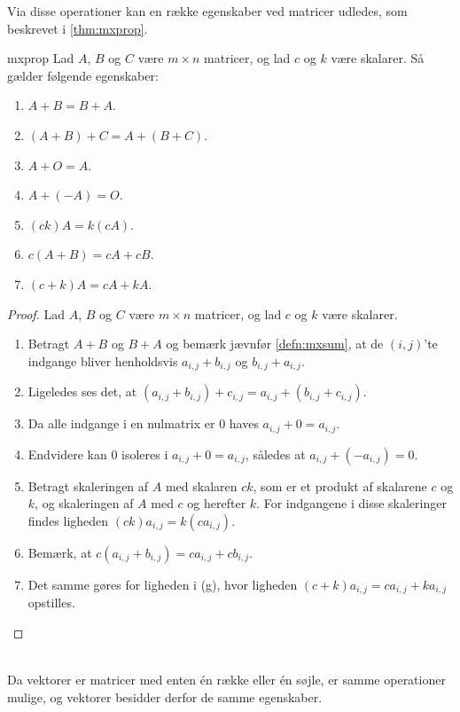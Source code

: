 %
Via disse operationer kan en række egenskaber ved matricer udledes, som beskrevet i \ref{thm:mxprop}.
%
\begin{thm}{}{mxprop}
Lad $A$, $B$ og $C$ være $m \times n$ matricer, og lad $c$ og $k$ være skalarer.
Så gælder følgende egenskaber:
\begin{enumerate}[label=(\alph*)]
\item $A + B = B + A$.
\item $(A + B) + C = A + (B + C)$.
\item $A + O = A$.
\item $A + (-A) = O$.
\item $(ck)A = k(cA)$.
\item $c(A + B) = cA + cB$.
\item $(c + k)A = cA + kA$.
\end{enumerate}
\end{thm}
%
\begin{proof}
Lad $A$, $B$ og $C$ være $m \times n$ matricer, og lad $c$ og $k$ være skalarer.
\begin{enumerate}[label=(\alph*)]
\item Betragt $A + B$ og $B + A$ og bemærk jævnfør \ref{defn:mxsum}, at de $(i,j)$'te indgange bliver henholdsvis $a_{i,j} + b_{i,j}$ og $b_{i,j} + a_{i,j}$.
%
\item Ligeledes ses det, at $(a_{i,j} + b_{i,j}) + c_{i,j} = a_{i,j} + (b_{i,j} + c_{i,j})$.
%
\item Da alle indgange i en nulmatrix er $0$ haves  $a_{i,j} + 0 = a_{i,j}$.
% 
\item Endvidere kan $0$ isoleres i $a_{i,j} + 0 = a_{i,j}$, således at $a_{i,j} + (-a_{i,j}) = 0$.
%
\item Betragt skaleringen af $A$ med skalaren $ck$, som er et produkt af skalarene $c$ og $k$, og skaleringen af $A$ med $c$ og herefter $k$.
For indgangene i disse skaleringer findes ligheden $(ck)a_{i,j} = k(ca_{i,j})$.
%
\item Bemærk, at $c(a_{i,j} + b_{i,j}) = ca_{i,j} + cb_{i,j}$.
%
\item Det samme gøres for ligheden i (g), hvor ligheden $(c + k)a_{i,j} = ca_{i,j} + ka_{i,j}$ opstilles.
\end{enumerate}
\end{proof}
\noindent
\\
%
Da vektorer er matricer med enten én række eller én søjle, er samme operationer mulige, og vektorer besidder derfor de samme egenskaber.
